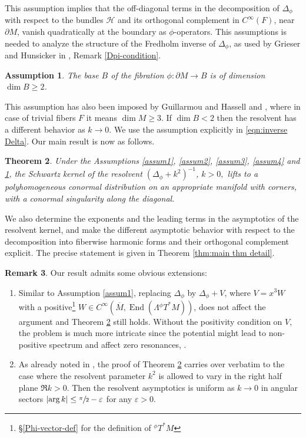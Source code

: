 \documentclass[JEP,XML,SOM,Unicode,NoFloatCountersInSection,published]{cedram}
\theoremstyle{plain}
\newtheorem{Th}{Theorem}[section]
\newtheorem{assum}[Th]{Assumption}
\theoremstyle{definition}
\newtheorem{Rem}[Th]{Remark}
\DeclareMathOperator{\End}{End}
\newcommand{\Cinf}{C^\infty}
\newcommand{\dM}{{\partial M}}
\newcommand{\Mbar}{{\overline{M}}}\let\M\Mbar
\let\eps\varepsilon
\begin{document}
This assumption implies that the off-diagonal terms in the decomposition of $\Delta_{\phi}$ with respect to the bundles $\mathscr{H}$ and its orthogonal complement in $\Cinf(F)$, near $\dM$, vanish quadratically at the boundary as $\phi$-operators. This assumptions is needed to analyze the structure of the Fredholm inverse of $\Delta_{\phi}$, as
used by Grieser and Hunsicker in \cite[Th.\,2]{grieser-para}, \cf Remark \ref{Dpi-condition}.

\begin{assum}\label{assum5}
The base $B$ of the fibration $\phi: \partial M \!\to\! B$ is of dimension \hbox{$\dim B \!\geq\! 2$}.
\end{assum}

This assumption has also been imposed by Guillarmou and Hassell
\cite{guillarmou2008resolvent} and \cite{guillarmou2009resolvent}, where
in case of trivial fibers $F$ it means $\dim M \geq 3$. If $\dim B<2$ then the resolvent has a different behavior as $k\to0$. We use the assumption explicitly in \eqref{eqn:inverse Delta}. Our main result is now as follows.

\begin{Th}\label{main-theorem-intro}
Under the Assumptions \ref{assum1}, \ref{assum2}, \ref{assum3}, \ref{assum4} and \ref{assum5},
the Schwartz kernel of the resolvent
$(\Delta_{\phi} + k^{2})^{-1}$, $k>0,$ lifts to a polyhomogeneous conormal
distribution on an appropriate manifold with corners,
with a conormal singularity along the diagonal.
\end{Th}
We also determine the exponents and the leading terms in the asymptotics of the resolvent kernel, and make the different asymptotic behavior with respect to the decomposition into fiberwise harmonic forms and their orthogonal complement explicit. The precise statement is given in Theorem \ref{thm:main thm detail}.

\begin{Rem}
Our result admits some obvious extensions:
\begin{enumerate}
\item Similar to Assumption \ref{assum1}, replacing $\Delta_\phi$ by $\Delta_\phi + V$, where
$V = x^3 W$ with a positive\footnote{\cf \S \ref{Phi-vector-def} for the definition of ${}^{\phi}T^*M$} $W \in C^\infty(\Mbar, \End(\Lambda{}^{\phi}T^*M))$,
does not affect the argument and Theorem \ref{main-theorem-intro} still holds. Without the positivity condition on $V$, the problem is much more
intricate since the potential might lead to non-positive spectrum and affect zero resonances, \cf \cite{guillarmou2009resolvent}.
\item As already noted in \cite[Th.\,6]{Sher}, the proof of Theorem \ref{main-theorem-intro} carries over verbatim to
the case where the resolvent parameter $k^2$ is allowed to vary in the right half plane $\Re k>0$. Then
the resolvent asymptotics is
uniform as $k\to0$ in angular sectors $\left|\arg k\right| \leq \sfrac\pi2-\eps$ for any $\eps>0$.
\end{enumerate}
\end{Rem}
\end{document}
